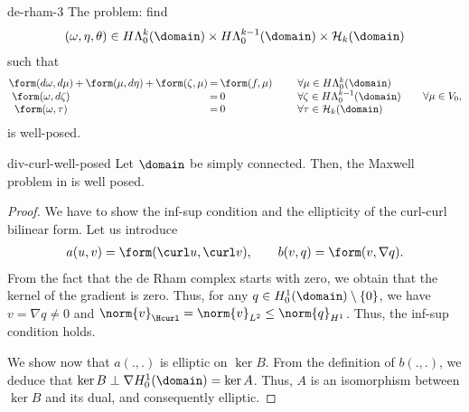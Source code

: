\begin{Lemma}{de-rham-3}
  The problem: find
  \begin{gather}
    (\omega,\eta,\theta)
    \in H\Lambda^k_0(\domain)
    \times H\Lambda^{k-1}_0(\domain)
    \times \mathcal H_k(\domain)
  \end{gather}
   such that
  \begin{gather}
    \arraycolsep1pt
    \begin{array}{cccccclll}
      \form(d \omega, d\mu) &+& \form(\mu,d\eta) &+& \form(\zeta,\mu)
      &=& \form(f,\mu)
      & \qquad & \forall \mu\in H\Lambda^k_0(\domain)
      \\
      \form(\omega,d\zeta) && && &=&0
      & \qquad & \forall \zeta\in H\Lambda^{k-1}_0(\domain)
      \\
      \form(\omega,\tau) && && &=& 0
      & \qquad & \forall \tau\in \mathcal H_k(\domain)
    \end{array}
    \qquad\forall \mu\in V_0,
  \end{gather}
  is well-posed.
\end{Lemma}

\begin{Theorem}{div-curl-well-posed}
  Let $\domain$ be simply connected. Then, the Maxwell problem in
   is well posed.
\end{Theorem}

\begin{proof}
  We have to show the inf-sup condition and the ellipticity of the
  curl-curl bilinear form. Let us introduce
  \begin{gather}
    a(u,v) = \form(\curl u, \curl v),
    \qquad
    b(v,q) = \form(v,\nabla q).
  \end{gather}
  From the fact that the de Rham complex starts with zero, we obtain
  that the kernel of the gradient is zero. Thus, for any $q\in
  H^1_0(\domain)\setminus\{0\}$, we have $v = \nabla q \neq 0$ and
  $\norm{v}_{\Hcurl} = \norm{v}_{L^2} \le \norm{q}_{H^1}$. Thus, the
  inf-sup condition holds.

  We show now that $a(.,.)$ is elliptic on $\ker B$. From the
  definition of $b(.,.)$, we deduce that
  $\ker B \perp \nabla H^1_0(\domain) = \ker A$. Thus, $A$ is an
  isomorphism between $\ker B$ and its dual, and consequently
  elliptic.
\end{proof}

